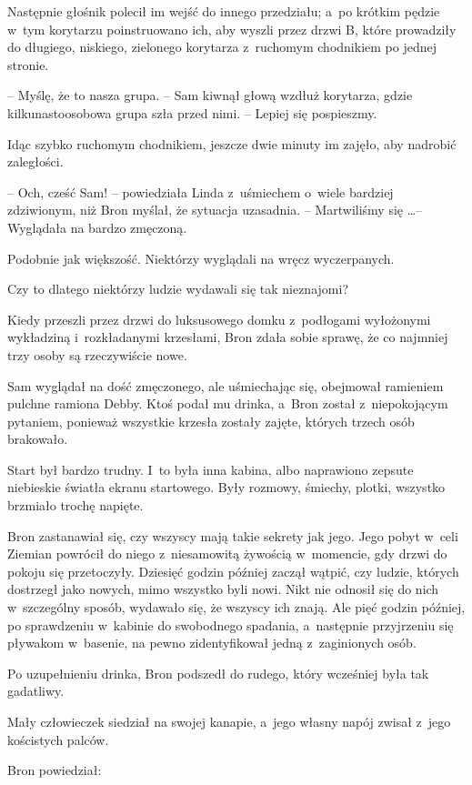 \documentclass[oneside,polish,11pt,rmheadings]{mwbk}
\begin{document}
Następnie głośnik polecił im wejść do innego przedziału; a~po krótkim pędzie w~tym korytarzu poinstruowano ich, aby wyszli przez drzwi B, które prowadziły do długiego, niskiego, zielonego korytarza z~ruchomym chodnikiem po jednej stronie. 

-- Myślę, że to nasza grupa. -- Sam kiwnął głową wzdłuż korytarza, gdzie kilkunastoosobowa grupa szła przed nimi. -- Lepiej się pospieszmy. 

Idąc szybko ruchomym chodnikiem, jeszcze dwie minuty im zajęło, aby nadrobić zaległości. 

-- Och, cześć Sam! -- powiedziała Linda z~uśmiechem o~wiele bardziej zdziwionym, niż Bron myślał, że sytuacja uzasadnia. -- Martwiliśmy się \ldots  -- Wyglądała na bardzo zmęczoną. 

Podobnie jak większość. Niektórzy wyglądali na wręcz wyczerpanych. 

Czy to dlatego niektórzy ludzie wydawali się tak nieznajomi? 

Kiedy przeszli przez drzwi do luksusowego domku z~podłogami wyłożonymi wykładziną i~rozkładanymi krzesłami, Bron zdała sobie sprawę, że co najmniej trzy osoby są rzeczywiście nowe. 

Sam wyglądał na dość zmęczonego, ale uśmiechając się, obejmował ramieniem pulchne ramiona Debby. Ktoś podał mu drinka, a~Bron został z~niepokojącym pytaniem, ponieważ wszystkie krzesła zostały zajęte, których trzech osób brakowało. 

Start był bardzo trudny. I~to była inna kabina, albo naprawiono zepsute niebieskie światła ekranu startowego. Były rozmowy, śmiechy, plotki, wszystko brzmiało trochę napięte. 

Bron zastanawiał się, czy wszyscy mają takie sekrety jak jego. Jego pobyt w~celi Ziemian powrócił do niego z~niesamowitą żywością w~momencie, gdy drzwi do pokoju się przetoczyły. Dziesięć godzin później zaczął wątpić, czy ludzie, których dostrzegł jako nowych, mimo wszystko byli nowi. Nikt nie odnosił się do nich w~szczególny sposób, wydawało się, że wszyscy ich znają. Ale pięć godzin później, po sprawdzeniu w~kabinie do swobodnego spadania, a~następnie przyjrzeniu się pływakom w~basenie, na pewno zidentyfikował jedną z~zaginionych osób. 

Po uzupełnieniu drinka, Bron podszedł do rudego, który wcześniej była tak gadatliwy. 

Mały człowieczek siedział na swojej kanapie, a~jego własny napój zwisał z~jego kościstych palców. 

Bron powiedział: 
\end{document}

